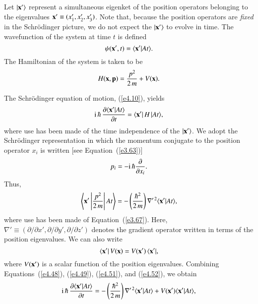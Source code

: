 Let $|{\bf x'}\rangle$ represent a simultaneous eigenket of the position operators
belonging to the eigenvalues ${\bf x'} \equiv (x_1', x_2', x_3')$. Note that, because 
the position operators  are {\em fixed}\/ in the Schr\"{o}dinger picture, we do not
expect the $|{\bf x}'\rangle$ to evolve in time. The wavefunction of the system
at time $t$ is defined
\begin{equation}
\psi({\bf x'}, t) = \langle {\bf x'}| At\rangle.
\end{equation}
The Hamiltonian of the system is taken to be
\begin{equation}\label{e4.48}
H({\bf x},{\bf p}) = \frac{{p}^2}{2\,m} + V({\bf x}).
\end{equation}

The Schr\"{o}dinger  equation of motion, (\ref{e4.10}), yields 
\begin{equation}\label{e4.49}
{\rm i}\,\hbar \,\frac{\partial \langle {\bf x'}|At\rangle}{\partial t}
= \langle {\bf x'}|\,H\,| At\rangle,
\end{equation}
where use has been made of the time independence of the $|{\bf x'}\rangle$. 
We adopt the Schr\"{o}d\-inger representation in which the momentum conjugate
to the position operator $x_i$ is written  [see Equation~(\ref{e3.63})]
\begin{equation}\label{e4.50}
p_i = -{\rm i}\,\hbar\frac{\partial}{\partial x_i}.
\end{equation}
Thus,
\begin{equation}\label{e4.51}
\left\langle {\bf x}'\left|\frac{{p}^2}{2\,m}\right| At\right\rangle = 
- \left(\frac{\hbar^2}{2\,m}\right)
\nabla'^{\,2}\langle {\bf x'} |At\rangle,
\end{equation}
where use has been made of Equation~(\ref{e3.67}). Here, $\nabla'\equiv(\partial/\partial x',
\partial/\partial y', \partial/\partial z')$ denotes the gradient operator written
in terms of the position eigenvalues. We can also
write
\begin{equation}\label{e4.52}
\langle {\bf x'}|\,V({\bf x}) = V({\bf x'})\,\langle {\bf x'} |,
\end{equation}
where $V({\bf x'})$ is  a scalar function of the position eigenvalues. Combining
Equations~(\ref{e4.48}), (\ref{e4.49}), (\ref{e4.51}), and (\ref{e4.52}), we obtain
\begin{equation}
{\rm i}\,\hbar \,\frac{\partial \langle {\bf x}'|At\rangle}{\partial t}
= - \left(\frac{\hbar^2}{2\,m}\right)
\nabla'^{\,2}\langle{\bf x'} |At\rangle + V({\bf x}') \langle {\bf x}'|At\rangle,
\end{equation}
